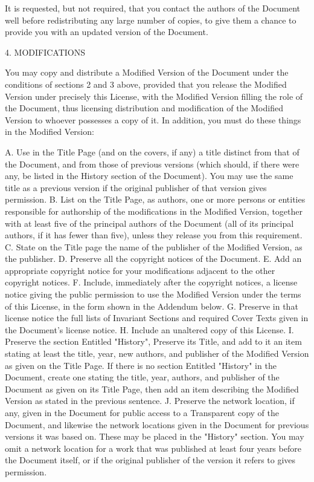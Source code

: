 \documentclass[oneside,english,a4paper,10pt,oneside,openany,final]{memoir}
\begin{document}
It is requested, but not required, that you contact the authors of the Document well before redistributing any large number of copies, to give them a chance to provide you with an updated version of the Document.

4. MODIFICATIONS

You may copy and distribute a Modified Version of the Document under the conditions of sections 2 and 3 above, provided that you release the Modified Version under precisely this License, with the Modified Version filling the role of the Document, thus licensing distribution and modification of the Modified Version to whoever possesses a copy of it. In addition, you must do these things in the Modified Version:

    A. Use in the Title Page (and on the covers, if any) a title distinct from that of the Document, and from those of previous versions (which should, if there were any, be listed in the History section of the Document). You may use the same title as a previous version if the original publisher of that version gives permission.
    B. List on the Title Page, as authors, one or more persons or entities responsible for authorship of the modifications in the Modified Version, together with at least five of the principal authors of the Document (all of its principal authors, if it has fewer than five), unless they release you from this requirement.
    C. State on the Title page the name of the publisher of the Modified Version, as the publisher.
    D. Preserve all the copyright notices of the Document.
    E. Add an appropriate copyright notice for your modifications adjacent to the other copyright notices.
    F. Include, immediately after the copyright notices, a license notice giving the public permission to use the Modified Version under the terms of this License, in the form shown in the Addendum below.
    G. Preserve in that license notice the full lists of Invariant Sections and required Cover Texts given in the Document's license notice.
    H. Include an unaltered copy of this License.
    I. Preserve the section Entitled "History", Preserve its Title, and add to it an item stating at least the title, year, new authors, and publisher of the Modified Version as given on the Title Page. If there is no section Entitled "History" in the Document, create one stating the title, year, authors, and publisher of the Document as given on its Title Page, then add an item describing the Modified Version as stated in the previous sentence.
    J. Preserve the network location, if any, given in the Document for public access to a Transparent copy of the Document, and likewise the network locations given in the Document for previous versions it was based on. These may be placed in the "History" section. You may omit a network location for a work that was published at least four years before the Document itself, or if the original publisher of the version it refers to gives permission.
\end{document}
